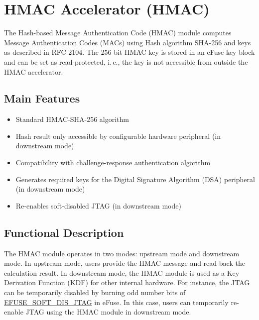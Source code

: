 \documentclass[main\_\_EN.tex]{subfiles}
\begin{document}

\ifglobal
\else
    {\let\clearpage\relax \listoftodos}
    \tableofcontents
\fi



\chapter{HMAC Accelerator (HMAC)}
\label{mod:hmac}
\hypertarget{hmac}{}


The Hash-based Message Authentication Code (HMAC) module computes Message Authentication Codes (MACs) using Hash algorithm SHA-256 and keys as described in RFC 2104. The 256-bit HMAC key is stored in an eFuse key block and can be set as read-protected, i.\,e., the key is not accessible from outside the HMAC accelerator.

\section{Main Features}
\begin{itemize}
    \item Standard HMAC-SHA-256 algorithm
    \item Hash result only accessible by configurable hardware peripheral (in downstream mode)
    \item Compatibility with challenge-response authentication algorithm
    \item Generates required keys for the Digital Signature Algorithm (DSA) peripheral (in downstream mode)
    \item Re-enables soft-disabled JTAG (in downstream mode)
\end{itemize}


\section{Functional Description}
The HMAC module operates in two modes: upstream mode and downstream mode. In upstream mode, users provide the HMAC message and read back the calculation result. In downstream mode, the HMAC module is used as a Key Derivation Function (KDF) for other internal hardware. For instance, the JTAG can be temporarily disabled by burning odd number bits of \hyperref[fielddesc:EFUSESOFTDISJTAG]{EFUSE\_SOFT\_DIS\_JTAG} in eFuse. In this case, users can temporarily re-enable JTAG using the HMAC module in downstream mode.
\end{document}
